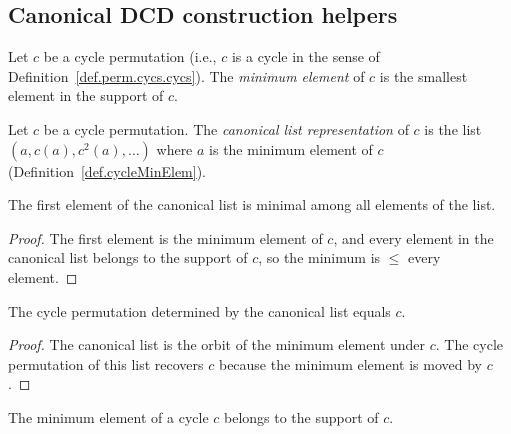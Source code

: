 \subsection{Canonical DCD construction helpers}

\begin{definition}
\label{def.cycleMinElem}
\leanhelper
\leanok
Let $c$ be a cycle permutation (i.e., $c$ is a cycle in the sense of
Definition~\ref{def.perm.cycs.cycs}).
The \emph{minimum element} of $c$ is the smallest element in the support of $c$.
\end{definition}

\begin{definition}
\label{def.cycleToCanonicalList}
\leanhelper
\leanok
Let $c$ be a cycle permutation. The \emph{canonical list representation}
of $c$ is the list $(a, c(a), c^2(a), \ldots)$ where $a$ is the minimum
element of $c$ (Definition~\ref{def.cycleMinElem}).
\end{definition}

\begin{lemma}
\label{lem.cycleToCanonicalList_head_le}
\leanhelper
\leanok
The first element of the canonical list is minimal among all elements of
the list.
\end{lemma}

\begin{proof}
\leanok
The first element is the minimum element of $c$, and
every element in the canonical list belongs to the support of $c$, so
the minimum is $\leq$ every element.
\end{proof}

\begin{lemma}
\label{lem.cycleToCanonicalList_formPerm}
\leanhelper
\leanok
The cycle permutation determined by the canonical list equals $c$.
\end{lemma}

\begin{proof}
\leanok
The canonical list is the orbit of the minimum element under $c$.
The cycle permutation of this list recovers $c$ because the minimum element
is moved by $c$.
\end{proof}

\begin{lemma}
\label{lem.cycleMinElem_mem_support}
\leanhelper
\leanok
The minimum element of a cycle $c$ belongs to the support of $c$.
\end{lemma}

